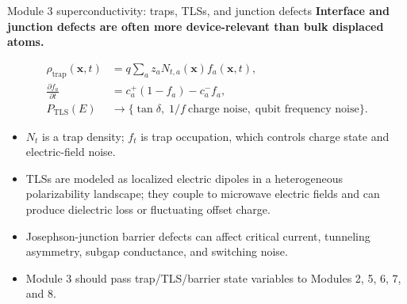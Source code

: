 \documentclass[aspectratio=169,10pt]{beamer}
\begin{document}
\begin{frame}{Module 3 superconductivity: traps, TLSs, and junction defects}
\footnotesize
\textbf{Interface and junction defects are often more device-relevant than bulk displaced atoms.}

\vspace{-0.2em}
\begin{align*}
\rho_{\mathrm{trap}}(\mathbf x,t)&=q\sum_a z_a N_{t,a}(\mathbf x)f_a(\mathbf x,t),\\[-0.05em]
\frac{\partial f_a}{\partial t}
&=c_a^{+}(1-f_a)-c_a^{-}f_a,\\[-0.05em]
P_{\mathrm{TLS}}(E)&\rightarrow \{\tan\delta,\;1/f\ \text{charge noise},\;\text{qubit frequency noise}\}.
\end{align*}

\vspace{-0.25em}
\begin{itemize}
    \item $N_t$ is a trap density; $f_t$ is trap occupation, which controls charge state and electric-field noise.
    \item TLSs are modeled as localized electric dipoles in a heterogeneous polarizability landscape; they couple to microwave electric fields and can produce dielectric loss or fluctuating offset charge.
    \item Josephson-junction barrier defects can affect critical current, tunneling asymmetry, subgap conductance, and switching noise.
    \item Module 3 should pass trap/TLS/barrier state variables to Modules 2, 5, 6, 7, and 8.
\end{itemize}
\end{frame}
\end{document}
